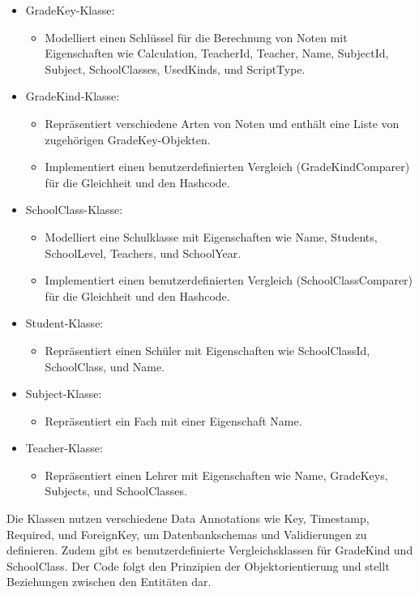 \begin{itemize}
\begin{itemize}
    \end{itemize}
    \item GradeKey-Klasse:
    \begin{itemize}
        \item Modelliert einen Schlüssel für die Berechnung von Noten mit Eigenschaften wie Calculation, TeacherId, Teacher, Name, SubjectId, Subject, SchoolClasses, UsedKinds, und ScriptType.
    \end{itemize}
    \item GradeKind-Klasse:
    \begin{itemize}
        \item Repräsentiert verschiedene Arten von Noten und enthält eine Liste von zugehörigen GradeKey-Objekten.
        \item Implementiert einen benutzerdefinierten Vergleich (GradeKindComparer) für die Gleichheit und den Hashcode.
    \end{itemize}
    \item SchoolClass-Klasse:
    \begin{itemize}
        \item Modelliert eine Schulklasse mit Eigenschaften wie Name, Students, SchoolLevel, Teachers, und SchoolYear.
        \item Implementiert einen benutzerdefinierten Vergleich (SchoolClassComparer) für die Gleichheit und den Hashcode. 
    \end{itemize}
    \item Student-Klasse:
    \begin{itemize}
        \item Repräsentiert einen Schüler mit Eigenschaften wie SchoolClassId, SchoolClass, und Name.
    \end{itemize}
    \item Subject-Klasse:
    \begin{itemize}
        \item Repräsentiert ein Fach mit einer Eigenschaft Name.
    \end{itemize}
    \item Teacher-Klasse:
    \begin{itemize}
        \item Repräsentiert einen Lehrer mit Eigenschaften wie Name, GradeKeys, Subjects, und SchoolClasses.
    \end{itemize}
\end{itemize}

Die Klassen nutzen verschiedene Data Annotations wie Key, Timestamp, Required, und ForeignKey, um Datenbankschemas und Validierungen zu definieren. Zudem gibt es benutzerdefinierte Vergleichsklassen für GradeKind und SchoolClass. Der Code folgt den Prinzipien der Objektorientierung und stellt Beziehungen zwischen den Entitäten dar.





